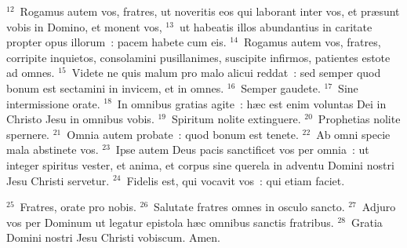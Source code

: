 ${}^{12}$~Rogamus autem vos, fratres, ut noveritis eos qui laborant inter vos, et pr\ae sunt vobis in Domino, et monent vos,
${}^{13}$~ut habeatis illos abundantius in caritate propter opus illorum~: pacem habete cum eis.
${}^{14}$~Rogamus autem vos, fratres, corripite inquietos, consolamini pusillanimes, suscipite infirmos, patientes estote ad omnes.
${}^{15}$~Videte ne quis malum pro malo alicui reddat~: sed semper quod bonum est sectamini in invicem, et in omnes.
${}^{16}$~Semper gaudete.
${}^{17}$~Sine intermissione orate.
${}^{18}$~In omnibus gratias agite~: h\ae c est enim voluntas Dei in Christo Jesu in omnibus vobis.
${}^{19}$~Spiritum nolite extinguere.
${}^{20}$~Prophetias nolite spernere.
${}^{21}$~Omnia autem probate~: quod bonum est tenete.
${}^{22}$~Ab omni specie mala abstinete vos.
${}^{23}$~Ipse autem Deus pacis sanctificet vos per omnia~: ut integer spiritus vester, et anima, et corpus sine querela in adventu Domini nostri Jesu Christi servetur.
${}^{24}$~Fidelis est, qui vocavit vos~: qui etiam faciet.


${}^{25}$~Fratres, orate pro nobis.
${}^{26}$~Salutate fratres omnes in osculo sancto.
${}^{27}$~Adjuro vos per Dominum ut legatur epistola h\ae c omnibus sanctis fratribus.
${}^{28}$~Gratia Domini nostri Jesu Christi vobiscum. Amen.
